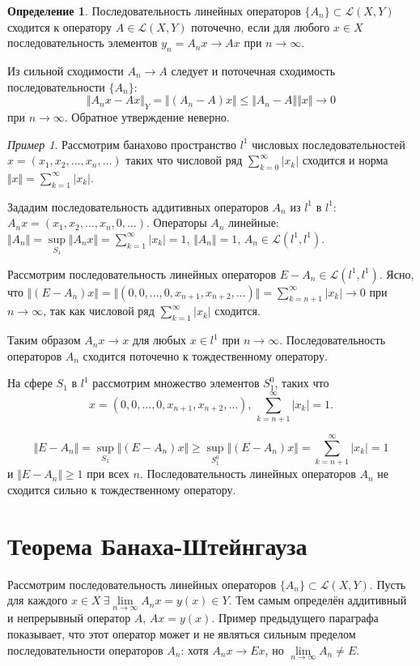 \documentclass[12pt,a4paper,titlepage,oneside]{book}
\theoremstyle{definition}
\newtheorem*{definition}{Определение}
\theoremstyle{plain}
\theoremstyle{break}
\theoremstyle{remark}
\theoremstyle{remark}
\newtheorem*{example}{Пример}
\theoremstyle{remark}
\theoremstyle{remark}
\theoremstyle{plain}
\theoremstyle{plain}
\begin{document}
\begin{definition}
Последовательность линейных операторов $\{A_n\} \subset \mathcal{L}(X,Y)$ сходится к оператору $A\in \mathcal{L}(X,Y)$ поточечно, если для любого $x\in X$ последовательность элементов $y_n=A_nx\to Ax$ при $n\to \infty$.
\end{definition}

Из сильной сходимости $A_n\to A$ следует и поточечная сходимость последовательности $\{A_n\}$:
$$\Vert A_nx-Ax\Vert_Y = \Vert(A_n-A)x\Vert \leqslant \Vert A_n-A\Vert \Vert x\Vert\to 0$$ 
при $n\to \infty$.
Обратное утверждение неверно.

\begin{example}
Рассмотрим банахово пространство $l^1$ числовых последовательностей $x=(x_1,x_2,\ldots,x_n,\ldots)$ таких что числовой ряд $\displaystyle\sum_{k=0}^\infty \lvert x_k\rvert $ сходится и норма $\Vert x\Vert=\displaystyle\sum_{k=1}^\infty \lvert x_k\rvert$.

Зададим последовательность аддитивных операторов $A_n$ из $l^1$ в $l^1$: 
$A_nx=(x_1,x_2,\ldots,x_n,0,\ldots)$.
Операторы $A_n$ линейные:
$\Vert A_n\Vert=\sup \limits_{S_1} \Vert A_nx\Vert=\displaystyle\sum_{k=1}^\infty \lvert x_k\rvert =1$, $\Vert A_n\Vert=1$, $A_n\in \mathcal{L}(l^1,l^1)$.

Рассмотрим последовательность линейных операторов $E-A_n\in \mathcal{L}(l^1,l^1)$. Ясно, что $\Vert(E-A_n)x\Vert=\Vert(0,0,\ldots,0,x_{n+1},x_{n+2},\ldots)\Vert=\displaystyle\sum_{k=n+1}^\infty \lvert x_k\rvert  \to 0$ при $n\to \infty$, так как числовой ряд $\displaystyle\sum_{k=1}^\infty \lvert x_k\rvert $ сходится.

Таким образом $A_nx\to x$ для любых $x\in l^1$ при $n\to \infty$. Последовательность операторов $A_n$ сходится поточечно к тождественному оператору.

На сфере $S_1$ в $l^1$ рассмотрим множество элементов $S_1^0$, таких что 
$$x=(0,0,\ldots,0,x_{n+1},x_{n+2},\ldots) \mbox{, } \displaystyle\sum_{k=n+1}^\infty \lvert x_k\rvert=1.$$

$$\Vert E-A_n\Vert=\sup \limits_{S_1} \Vert(E-A_n)x\Vert \geqslant \sup \limits_{S_1^0} \Vert(E-A_n)x\Vert=\displaystyle\sum_{k=n+1}^\infty \lvert x_k\rvert=1$$
и $\Vert E-A_n\Vert \geqslant 1$ при всех $n$. Последовательность линейных операторов $A_n$ не сходится сильно к тождественному оператору.

\end{example}

\section{Теорема Банаха-Штейнгауза}
Рассмотрим последовательность линейных операторов $\lbrace A_n \rbrace \subset \mathcal{L}(X,Y)$. Пусть для каждого $x \in X\ \exists \lim\limits_{n\to \infty}A_n x = y(x) \in Y$. Тем самым определён аддитивный и непрерывный оператор $A$, $Ax = y(x)$. Пример предыдущего параграфа показывает, что этот оператор может и не являться сильным пределом последовательности операторов $A_n$: хотя $A_n x \to E x$, но $\lim \limits_{n \to \infty} A_n \ne E$.
\end{document}
